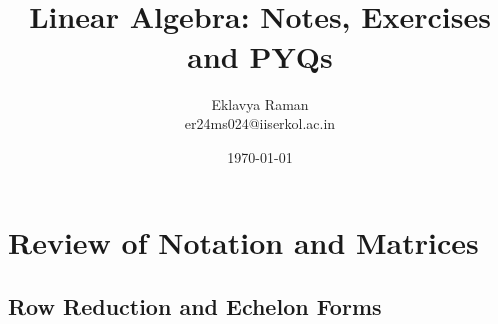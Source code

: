 \documentclass[openany]{book}
\begin{document}
\title{\Large{} \\ \vspace{5pt}
\large{Linear Algebra: Notes, Exercises and PYQs}}
\author{Eklavya Raman \\ \vspace{5pt} er24ms024@iiserkol.ac.in \\ \vspace{5pt}}
\date{\today}
\maketitle
\tableofcontents
\listoftheorems[
    show=mytheorem,
    title={List of Theorems}]

\setcounter{chapter}{-1}

\chapter{Review of Notation and Matrices}
\section{Row Reduction and Echelon Forms}
\end{document}
